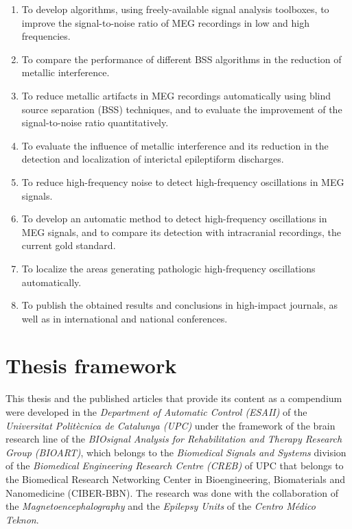 \begin{enumerate}[I]

\item To develop algorithms, using freely-available signal analysis toolboxes, to improve the signal-to-noise ratio of MEG recordings in low and high frequencies. 
\item To compare the performance of different BSS algorithms in the reduction of metallic interference. 
\item To reduce metallic artifacts in MEG recordings automatically using blind source separation (BSS) techniques, and to evaluate the improvement of the signal-to-noise ratio quantitatively.
\item To evaluate the influence of metallic interference and its reduction in the detection and localization of interictal epileptiform discharges.
\item To reduce high-frequency noise to detect high-frequency oscillations in MEG signals.
\item To develop an automatic method to detect high-frequency oscillations in MEG signals, and to compare its detection with intracranial recordings, the current gold standard.
\item To localize the areas generating pathologic high-frequency oscillations automatically.
\item To publish the obtained results and conclusions in high-impact journals, as well as in international and national conferences.

\end{enumerate}

     \section{Thesis framework}
     
This thesis and the published articles that provide its content as a compendium were developed in the \emph{Department of Automatic Control (ESAII)} of the \emph{Universitat Polit\`{e}cnica de Catalunya (UPC)} under the framework of the brain research line of the \emph{BIOsignal Analysis for Rehabilitation and Therapy Research Group (BIOART)}, which belongs to the \emph{Biomedical Signals and Systems} division of the \emph{Biomedical Engineering Research Centre (CREB)} of UPC that belongs to the Biomedical Research Networking Center in Bioengineering, Biomaterials and Nanomedicine (CIBER-BBN). The research was done with the collaboration of the \textit{Magnetoencephalography} and the \textit{Epilepsy Units} of the \emph{Centro Médico Teknon}.	

